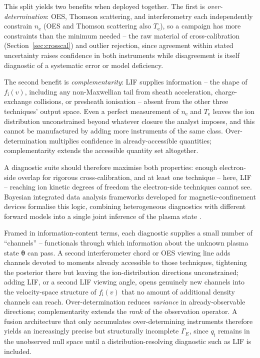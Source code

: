 This split yields two benefits when deployed together. The first is \emph{over-determination}: OES, Thomson scattering, and interferometry each independently constrain $n_{\mathrm{e}}$ (OES and Thomson scattering also $T_{\mathrm{e}}$), so a campaign has more constraints than the minimum needed -- the raw material of cross-calibration (Section~\ref{sec:crosscal}) and outlier rejection, since agreement within stated uncertainty raises confidence in both instruments while disagreement is itself diagnostic of a systematic error or model deficiency.

The second benefit is \emph{complementarity}: LIF supplies information -- the shape of $f_{\mathrm{i}}(v)$, including any non-Maxwellian tail from sheath acceleration, charge-exchange collisions, or presheath ionisation -- absent from the other three techniques' output space. Even a perfect measurement of $n_{\mathrm{e}}$ and $T_{\mathrm{e}}$ leaves the ion distribution unconstrained beyond whatever closure the analyst imposes, and this cannot be manufactured by adding more instruments of the same class. Over-determination multiplies confidence in already-accessible quantities; complementarity extends the accessible quantity set altogether.

A diagnostic suite should therefore maximise both properties: enough electron-side overlap for rigorous cross-calibration, and at least one technique -- here, LIF -- reaching ion kinetic degrees of freedom the electron-side techniques cannot see. Bayesian integrated data analysis frameworks developed for magnetic-confinement devices formalise this logic, combining heterogeneous diagnostics with different forward models into a single joint inference of the plasma state \cite{ref0707,ref0712,ref0706}.

Framed in information-content terms, each diagnostic supplies a small number of ``channels'' -- functionals through which information about the unknown plasma state $\boldsymbol\theta$ can pass. A second interferometer chord or OES viewing line adds channels devoted to moments already accessible to those techniques, tightening the posterior there but leaving the ion-distribution directions unconstrained; adding LIF, or a second LIF viewing angle, opens genuinely new channels into the velocity-space structure of $f_{\mathrm{i}}(v)$ that no amount of additional density channels can reach. Over-determination reduces \emph{variance} in already-observable directions; complementarity extends the \emph{rank} of the observation operator. A fusion architecture that only accumulates over-determining instruments therefore yields an increasingly precise but structurally incomplete $\Gamma_{E}$, since $q_{\mathrm{i}}$ remains in the unobserved null space until a distribution-resolving diagnostic such as LIF is included.

